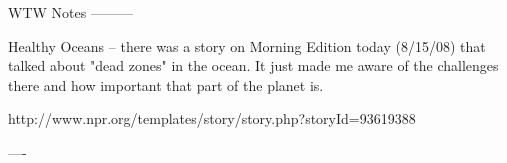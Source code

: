 WTW Notes
---------

Healthy Oceans -- there was a story on Morning Edition today (8/15/08) that talked about "dead zones" in the ocean. It just made me aware of the challenges there and how important that part of the planet is.

http://www.npr.org/templates/story/story.php?storyId=93619388

----

